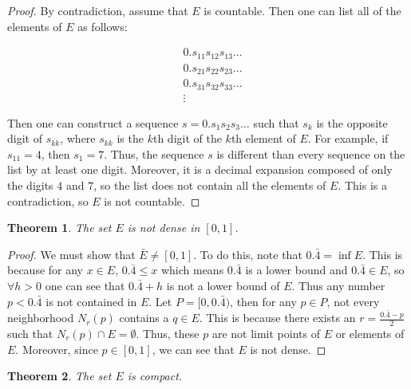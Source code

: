 \documentclass[psamsfonts]{amsart}
\newtheorem{thm}{Theorem}[section]
\theoremstyle{definition}
\theoremstyle{remark}
\numberwithin{equation}{section}
\begin{document}
\begin{proof}
By contradiction, assume that $E$ is countable. Then one can list all of the elements of $E$ as follows:

\begin{eqnarray*}
&0.s_{11} s_{12} s_{13} \ldots \\
&0.s_{21} s_{22} s_{23} \ldots \\
&0.s_{31} s_{32} s_{33} \ldots \\
&  \vdots
\end{eqnarray*}

Then one can construct a sequence $s = 0.s_1 s_2 s_3 \ldots$ such that $s_k$ is the opposite digit of $s_{kk}$, where $s_{kk}$ is the $k$th digit of the $k$th element of $E$. For example, if $s_{11} = 4$, then $s_1 = 7$. Thus, the sequence $s$ is different than every sequence on the list by at least one digit. Moreover, it is a decimal expansion composed of only the digits $4$ and $7$, so the list does not contain all the elements of $E$. This is a contradiction, so $E$ is not countable.
\end{proof}

\begin{thm}
The set $E$ is not dense in $[0,1]$.
\end{thm}

\begin{proof}
We must show that $\bar{E} \neq [0,1]$. To do this, note that $0.\bar{4} = \inf E$. This is because for any $x \in E$, $0.\bar{4} \leq x$ which means $0.\bar{4}$ is a lower bound and $ 0.\bar{4} \in E$, so $\forall h>0$ one can see that $0.\bar{4} + h$ is not a lower bound of $E$. Thus any number $p < 0.\bar{4}$ is not contained in $E$. Let $P = [0,0.\bar{4})$, then for any $p \in P$, not every neighborhood $N_r(p)$ contains a $q \in E$. This is because there exists an $r = \frac{0.\bar{4} - p}{2}$ such that $N_r(p) \cap E = \emptyset$. Thus, these $p$ are not limit points of $E$ or elements of $E$. Moreover, since $ p \in [0,1]$, we can see that $E$ is not dense. 
\end{proof}

\begin{thm}
The set $E$ is compact.
\end{thm}
\end{document}
